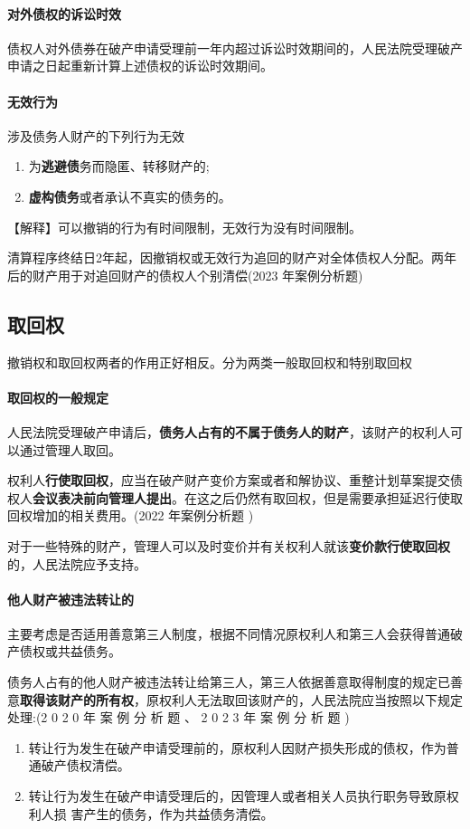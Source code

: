 \documentclass[UTF8,12pt]{ctexart}
\numberwithin{equation}{section} %
\numberwithin{figure}{section}
\numberwithin{table}{section}
\begin{document}
	\paragraph{对外债权的诉讼时效}
	债权人对外债券在破产申请受理前一年内超过诉讼时效期间的，人民法院受理破产申请之日起重新计算上述债权的诉讼时效期间。
	
	\paragraph{无效行为}
	涉及债务人财产的下列行为无效
	\begin{enumerate}
		\item 为\textbf{逃避债}务而隐匿、转移财产的; 
		
		\item \textbf{虚构债务}或者承认不真实的债务的。
	\end{enumerate}
	【解释】可以撤销的行为有时间限制，无效行为没有时间限制。
	
	清算程序终结日2年起，因撤销权或无效行为追回的财产对全体债权人分配。两年后的财产用于对追回财产的债权人个别清偿(2023 年案例分析题)
	
	\subsection{取回权}
	撤销权和取回权两者的作用正好相反。分为两类一般取回权和特别取回权
	\paragraph{取回权的一般规定}
	人民法院受理破产申请后，\textbf{债务人占有的不属于债务人的财产}，该财产的权利人可以通过管理人取回。
	
	权利人\textbf{行使取回权}，应当在破产财产变价方案或者和解协议、重整计划草案提交债权人\textbf{会议表决前向管理人提出}。在这之后仍然有取回权，但是需要承担延迟行使取回权增加的相关费用。(2022 年案例分析题 )
	
	对于一些特殊的财产，管理人可以及时变价并有关权利人就该\textbf{变价款行使取回权}的，人民法院应予支持。
	
	
	\paragraph{他人财产被违法转让的}
	主要考虑是否适用善意第三人制度，根据不同情况原权利人和第三人会获得普通破产债权或共益债务。
	
	债务人占有的他人财产被违法转让给第三人，第三人依据善意取得制度的规定已善意\textbf{取得该财产的所有权}，原权利人无法取回该财产的，人民法院应当按照以下规定处理:(2 0 2 0 年 案 例 分 析 题 、 2 0 2 3 年 案 例 分 析 题 ) 
	\begin{enumerate}
		\item 转让行为发生在破产申请受理前的，原权利人因财产损失形成的债权，作为普通破产债权清偿。
		
		\item 转让行为发生在破产申请受理后的，因管理人或者相关人员执行职务导致原权利人损 害产生的债务，作为共益债务清偿。
	\end{enumerate}
	
\end{document}
